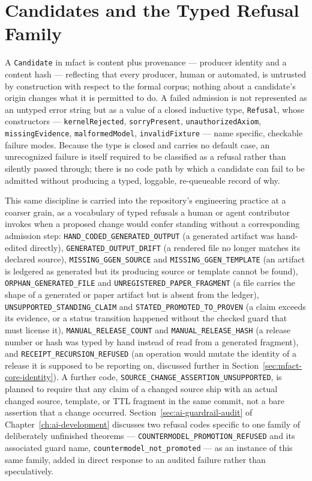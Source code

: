\section{Candidates and the Typed Refusal Family}
\label{sec:mfact-candidates}

A \texttt{Candidate} in \textsf{mfact} is content plus provenance ---
producer identity and a content hash --- reflecting that every producer,
human or automated, is untrusted by construction with respect to the
formal corpus; nothing about a candidate's origin changes what it is
permitted to do. A failed admission is not represented as an untyped
error string but as a value of a closed inductive type,
\texttt{Refusal}, whose constructors --- \texttt{kernelRejected},
\texttt{sorryPresent}, \texttt{unauthorizedAxiom},
\texttt{missingEvidence}, \texttt{malformedModel},
\texttt{invalidFixture} --- name specific, checkable failure modes.
Because the type is closed and carries no default case, an unrecognized
failure is itself required to be classified as a refusal rather than
silently passed through; there is no code path by which a candidate can
fail to be admitted without producing a typed, loggable, re-queueable
record of why.

This same discipline is carried into the repository's engineering
practice at a coarser grain, as a vocabulary of typed refusals a human
or agent contributor invokes when a proposed change would confer
standing without a corresponding admission step:
\texttt{HAND\_CODED\_GENERATED\_OUTPUT} (a generated artifact was
hand-edited directly), \texttt{GENERATED\_OUTPUT\_DRIFT} (a rendered
file no longer matches its declared source), \texttt{MISSING\_GGEN\_SOURCE}
and \texttt{MISSING\_GGEN\_TEMPLATE} (an artifact is ledgered as
generated but its producing source or template cannot be found),
\texttt{ORPHAN\_GENERATED\_FILE} and \texttt{UNREGISTERED\_PAPER\_FRAGMENT}
(a file carries the shape of a generated or paper artifact but is absent
from the ledger), \texttt{UNSUPPORTED\_STANDING\_CLAIM} and
\texttt{STATED\_PROMOTED\_TO\_PROVEN} (a claim exceeds its evidence, or a
status transition happened without the checked guard that must license
it), \texttt{MANUAL\_RELEASE\_COUNT} and \texttt{MANUAL\_RELEASE\_HASH}
(a release number or hash was typed by hand instead of read from a
generated fragment), and \texttt{RECEIPT\_RECURSION\_REFUSED} (an
operation would mutate the identity of a release it is supposed to be
reporting on, discussed further in
Section~\ref{sec:mfact-core-identity}). A further code,
\texttt{SOURCE\_CHANGE\_ASSERTION\_UNSUPPORTED}, is planned to require
that any claim of a changed source ship with an actual changed
source, template, or TTL fragment in the same commit, not a bare
assertion that a change occurred. Section~\ref{sec:ai-guardrail-audit} of
Chapter~\ref{ch:ai-development} discusses two refusal codes specific to
one family of deliberately unfinished theorems ---
\texttt{COUNTERMODEL\_PROMOTION\_REFUSED} and its associated guard name,
\texttt{countermodel\_not\_promoted} --- as an instance of this same
family, added in direct response to an audited failure rather than
speculatively.

